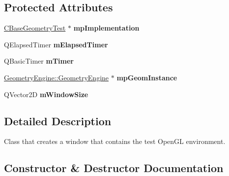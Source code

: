 \subsection*{Protected Attributes}
\begin{DoxyCompactItemize}
\item 
\mbox{\label{class_unit_test_1_1_c_test_window_a1bb1b3a0f01d8bfc3a827bf5c7d9642f}} 
\mbox{\hyperlink{class_unit_test_1_1_c_base_geometry_test}{C\+Base\+Geometry\+Test}} $\ast$ {\bfseries mp\+Implementation}
\item 
\mbox{\label{class_unit_test_1_1_c_test_window_a332a37bbc82b087b8ab63f11bd7ef5c3}} 
Q\+Elapsed\+Timer {\bfseries m\+Elapsed\+Timer}
\item 
\mbox{\label{class_unit_test_1_1_c_test_window_a6fca9db59d2655fae81fce0868dbec94}} 
Q\+Basic\+Timer {\bfseries m\+Timer}
\item 
\mbox{\label{class_unit_test_1_1_c_test_window_a3e4a6a3be6d22f48dedcec379a912be6}} 
\mbox{\hyperlink{class_geometry_engine_1_1_geometry_engine}{Geometry\+Engine\+::\+Geometry\+Engine}} $\ast$ {\bfseries mp\+Geom\+Instance}
\item 
\mbox{\label{class_unit_test_1_1_c_test_window_ab4095ee640b1b394c94d4edafbd5db62}} 
Q\+Vector2D {\bfseries m\+Window\+Size}
\end{DoxyCompactItemize}


\subsection{Detailed Description}
Class that creates a window that contains the test Open\+GL environment. 

\subsection{Constructor \& Destructor Documentation}
\mbox{\label{class_unit_test_1_1_c_test_window_a3ee8fe89bc10363e79083d9405fb9b8d}} 
